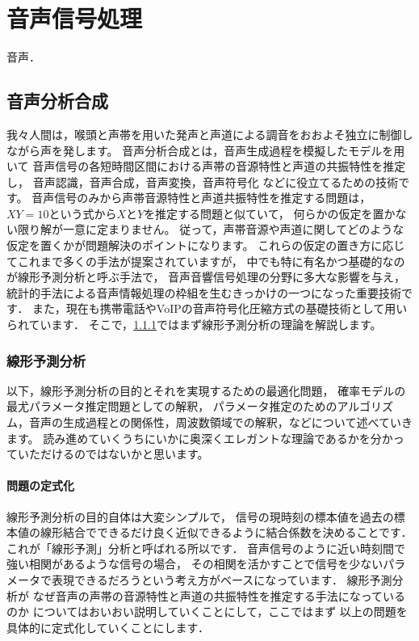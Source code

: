 ﻿

\chapter{音声信号処理}

\begin{leadbox}
音声．
\end{leadbox}

\section{音声分析合成}
\label{sec:lpc_intro}

我々人間は，喉頭と声帯を用いた発声と声道による調音をおおよそ独立に制御しながら声を発します。
音声分析合成とは，音声生成過程を模擬したモデルを用いて
音声信号の各短時間区間における声帯の音源特性と声道の共振特性を推定し，
音声認識，音声合成，音声変換，音声符号化
などに役立てるための技術です。
音声信号のみから声帯音源特性と声道共振特性を推定する問題は，
$XY=10$という式から$X$と$Y$を推定する問題と似ていて，
何らかの仮定を置かない限り解が一意に定まりません。
従って，声帯音源や声道に関してどのような仮定を置くかが問題解決のポイントになります。
これらの仮定の置き方に応じてこれまで多くの手法が提案されていますが，
中でも特に有名かつ基礎的なのが線形予測分析と呼ぶ手法で，
音声音響信号処理の分野に多大な影響を与え，
統計的手法による音声情報処理の枠組を生むきっかけの一つになった重要技術です．
また，現在も携帯電話やVoIPの音声符号化圧縮方式の基礎技術として用いられています．
そこで，\ref{sec:LPC}ではまず線形予測分析の理論を解説します。


\subsection{線形予測分析}
\label{sec:LPC}

以下，線形予測分析の目的とそれを実現するための最適化問題，
確率モデルの最尤パラメータ推定問題としての解釈，
パラメータ推定のためのアルゴリズム，音声の生成過程との関係性，周波数領域での解釈，などについて述べていきます。
読み進めていくうちにいかに奥深くエレガントな理論であるかを分かっていただけるのではないかと思います。

\subsubsection{問題の定式化}
\label{subsec:TD_LPC}

線形予測分析の目的自体は大変シンプルで，
信号の現時刻の標本値を過去の標本値の線形結合でできるだけ良く近似できるように結合係数を決めることです．
これが「線形予測」分析と呼ばれる所以です．
音声信号のように近い時刻間で強い相関があるような信号の場合，
その相関を活かすことで信号を少ないパラメータで表現できるだろうという考え方がベースになっています．
線形予測分析が
なぜ音声の声帯の音源特性と声道の共振特性を推定する手法になっているのか
についてはおいおい説明していくことにして，ここではまず
以上の問題を具体的に定式化していくことにします．

